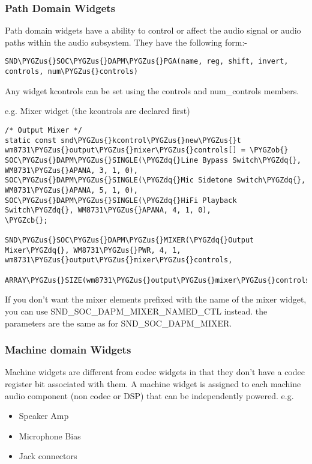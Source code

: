 \documentclass[a4paper,8pt,english]{sphinxmanual}
\def\PYGZus{\char`\_}
\def\PYGZob{\char`\{}
\def\PYGZcb{\char`\}}
\def\PYGZdq{\char`\"}
\begin{document}
\subsubsection{Path Domain Widgets}
\label{sound/soc/dapm:path-domain-widgets}
Path domain widgets have a ability to control or affect the audio signal or
audio paths within the audio subsystem. They have the following form:-

\begin{Verbatim}[commandchars=\\\{\}]
SND\PYGZus{}SOC\PYGZus{}DAPM\PYGZus{}PGA(name, reg, shift, invert, controls, num\PYGZus{}controls)
\end{Verbatim}

Any widget kcontrols can be set using the controls and num\_controls members.

e.g. Mixer widget (the kcontrols are declared first)

\begin{Verbatim}[commandchars=\\\{\}]
/* Output Mixer */
static const snd\PYGZus{}kcontrol\PYGZus{}new\PYGZus{}t wm8731\PYGZus{}output\PYGZus{}mixer\PYGZus{}controls[] = \PYGZob{}
SOC\PYGZus{}DAPM\PYGZus{}SINGLE(\PYGZdq{}Line Bypass Switch\PYGZdq{}, WM8731\PYGZus{}APANA, 3, 1, 0),
SOC\PYGZus{}DAPM\PYGZus{}SINGLE(\PYGZdq{}Mic Sidetone Switch\PYGZdq{}, WM8731\PYGZus{}APANA, 5, 1, 0),
SOC\PYGZus{}DAPM\PYGZus{}SINGLE(\PYGZdq{}HiFi Playback Switch\PYGZdq{}, WM8731\PYGZus{}APANA, 4, 1, 0),
\PYGZcb{};

SND\PYGZus{}SOC\PYGZus{}DAPM\PYGZus{}MIXER(\PYGZdq{}Output Mixer\PYGZdq{}, WM8731\PYGZus{}PWR, 4, 1, wm8731\PYGZus{}output\PYGZus{}mixer\PYGZus{}controls,
      ARRAY\PYGZus{}SIZE(wm8731\PYGZus{}output\PYGZus{}mixer\PYGZus{}controls)),
\end{Verbatim}

If you don't want the mixer elements prefixed with the name of the mixer widget,
you can use SND\_SOC\_DAPM\_MIXER\_NAMED\_CTL instead. the parameters are the same
as for SND\_SOC\_DAPM\_MIXER.


\subsubsection{Machine domain Widgets}
\label{sound/soc/dapm:machine-domain-widgets}
Machine widgets are different from codec widgets in that they don't have a
codec register bit associated with them. A machine widget is assigned to each
machine audio component (non codec or DSP) that can be independently
powered. e.g.
\begin{itemize}
\item {} 
Speaker Amp

\item {} 
Microphone Bias

\item {} 
Jack connectors

\end{itemize}
\end{document}
